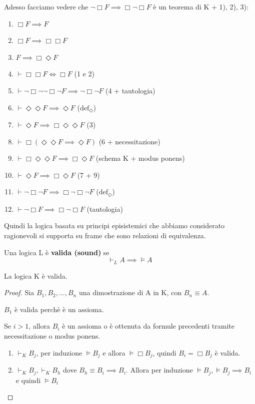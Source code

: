 \documentclass[../main.tex]{subfiles}
\begin{document}
Adesso facciamo vedere che $\neg \Box F \implies \Box \neg \Box F$ è un teorema di K + 1), 2), 3):
\begin{enumerate}
    \item $\Box F \implies F$
    \item $\Box F \implies \Box \Box F$
    \item $F \implies \Box \Diamond F$
    \item $\vdash \Box \Box F \iff \Box F$ (1 e 2)
    \item $\vdash \neg \Box \neg \neg \Box \neg F \implies \neg \Box \neg F$ (4 + tautologia)
    \item $\vdash \Diamond \Diamond F \implies \Diamond F$ ($\text{def}_\Diamond$)
    \item $\vdash \Diamond F \implies \Box \Diamond \Diamond F$ (3)
    \item $\vdash \Box(\Diamond \Diamond F \implies \Diamond F)$ (6 + necessitazione)
    \item $\vdash \Box \Diamond \Diamond F \implies \Box \Diamond F$ (schema K + modus ponens)
    \item $\vdash \Diamond F \implies \Box \Diamond F$ (7 + 9)
    \item $\vdash \neg \Box \neg F \implies \Box \neg \Box \neg F$ ($\text{def}_\Diamond$)
    \item $\vdash \neg \Box F \implies \Box \neg \Box F$ (tautologia)
\end{enumerate}
Quindi la logica basata su principi episistemici che abbiamo considerato ragionevoli si supporta su frame che sono relazioni di equivalenza.
\begin{definition}
    Una logica L è \textbf{valida (sound)} se
    \begin{equation*}
        \vdash_L A \implies \vDash A
    \end{equation*}
\end{definition}
\begin{theorem}
    La logica K è valida.
\end{theorem}
\begin{proof}
    Sia $B_1,B_2,\ldots,B_n$ una dimostrazione di A in K, con $B_n \equiv A$.

    $B_1$ è valida perchè è un assioma.

    Se $i > 1$, allora $B_i$ è un assioma o è ottenuta da formule precedenti tramite necessitazione o modus ponens.
    \begin{enumerate}
        \item $\vdash_K B_j$, per induzione $\vDash B_j$ e allora $\vDash \Box B_j$, quindi $B_i = \Box B_j$ è valida.
        \item $\vdash_K B_j, \vdash_K B_h$ dove $B_h \equiv B_i \implies B_i$. Allora per induzione $\vDash B_j, \vDash B_j \implies B_i$ e quindi $\vDash B_i$
    \end{enumerate}
\end{proof}
\end{document}
